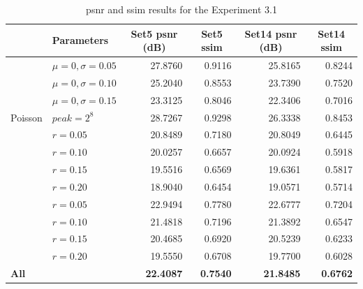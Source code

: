 \begin{table}[]
	\centering
	\begin{tabular}{|l|l|r|r|r|r|}
		\hline
		\rowcolor[HTML]{EFEFEF} 
		\multicolumn{1}{|c|}{\cellcolor[HTML]{EFEFEF}\textbf{Noise}} & \textbf{Parameters} & \multicolumn{1}{c|}{\cellcolor[HTML]{EFEFEF}\textbf{Set5 \gls{psnr} (dB)}} & \multicolumn{1}{c|}{\cellcolor[HTML]{EFEFEF}\textbf{Set5 \gls{ssim}}} & \multicolumn{1}{c|}{\cellcolor[HTML]{EFEFEF}\textbf{Set14 \gls{psnr} (dB)}} & \multicolumn{1}{c|}{\cellcolor[HTML]{EFEFEF}\textbf{Set14 \gls{ssim}}} \\ \hline
		\rowcolor[HTML]{FFFFFF} 
		\cellcolor[HTML]{EFEFEF} & $\mu=0, \sigma=0.05$ & 27.8760 & 0.9116 & 25.8165 & 0.8244 \\
		\rowcolor[HTML]{EFEFEF} 
		\cellcolor[HTML]{EFEFEF} & $\mu=0, \sigma=0.10$ & 25.2040 & 0.8553 & 23.7390 & 0.7520 \\
		\rowcolor[HTML]{FFFFFF} 
		\multirow{-3}{*}{\cellcolor[HTML]{EFEFEF}Gaussian} & $\mu=0, \sigma=0.15$ & 23.3125 & 0.8046 & 22.3406 & 0.7016 \\
		\rowcolor[HTML]{EFEFEF} 
		Poisson & $peak=2^8$ & 28.7267 & 0.9298 & 26.3338 & 0.8453 \\
		\rowcolor[HTML]{FFFFFF} 
		\cellcolor[HTML]{EFEFEF} & $r=0.05$ & 20.8489 & 0.7180 & 20.8049 & 0.6445 \\
		\rowcolor[HTML]{EFEFEF} 
		\cellcolor[HTML]{EFEFEF} & $r=0.10$ & 20.0257 & 0.6657 & 20.0924 & 0.5918 \\
		\rowcolor[HTML]{FFFFFF} 
		\cellcolor[HTML]{EFEFEF} & $r=0.15$ & 19.5516 & 0.6569 & 19.6361 & 0.5817 \\
		\rowcolor[HTML]{EFEFEF} 
		\multirow{-4}{*}{\cellcolor[HTML]{EFEFEF}Salt-and-pepper} & $r=0.20$ & 18.9040 & 0.6454 & 19.0571 & 0.5714 \\
		\rowcolor[HTML]{FFFFFF} 
		\cellcolor[HTML]{EFEFEF} & $r=0.05$ & 22.9494 & 0.7780 & 22.6777 & 0.7204 \\
		\rowcolor[HTML]{EFEFEF} 
		\cellcolor[HTML]{EFEFEF} & $r=0.10$ & 21.4818 & 0.7196 & 21.3892 & 0.6547 \\
		\rowcolor[HTML]{FFFFFF} 
		\cellcolor[HTML]{EFEFEF} & $r=0.15$ & 20.4685 & 0.6920 & 20.5239 & 0.6233 \\
		\rowcolor[HTML]{EFEFEF} 
		\multirow{-4}{*}{\cellcolor[HTML]{EFEFEF}Uniform} & $r=0.20$ & 19.5550 & 0.6708 & 19.7700 & 0.6028 \\
		\rowcolor[HTML]{FFFFFF} 
		\textbf{All} &  & \textbf{22.4087} & \textbf{0.7540} & \textbf{21.8485} & \textbf{0.6762}\\\hline
	\end{tabular}
	\caption{\gls{psnr} and \gls{ssim} results for the Experiment 3.1}
	\label{tab:experiment31}
\end{table}

